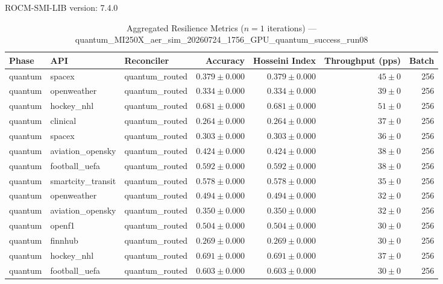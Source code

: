 ROCM-SMI-LIB version: 7.4.0

\begin{table}[htbp]
\caption{Aggregated Resilience Metrics ($n=1$ iterations) --- quantum_MI250X_aer_sim_20260724_1756_GPU_quantum_success_run08}
\begin{tabular}{l l l r r r r}
\hline
Phase & API & Reconciler & Accuracy & Hosseini Index & Throughput (pps) & Batch \\
\hline
quantum & spacex & quantum\_routed & $0.379\pm0.000$ & $0.379\pm0.000$ & $45\pm0$ & 256 \\
quantum & openweather & quantum\_routed & $0.334\pm0.000$ & $0.334\pm0.000$ & $39\pm0$ & 256 \\
quantum & hockey\_nhl & quantum\_routed & $0.681\pm0.000$ & $0.681\pm0.000$ & $51\pm0$ & 256 \\
quantum & clinical & quantum\_routed & $0.264\pm0.000$ & $0.264\pm0.000$ & $37\pm0$ & 256 \\
quantum & spacex & quantum\_routed & $0.303\pm0.000$ & $0.303\pm0.000$ & $36\pm0$ & 256 \\
quantum & aviation\_opensky & quantum\_routed & $0.424\pm0.000$ & $0.424\pm0.000$ & $38\pm0$ & 256 \\
quantum & football\_uefa & quantum\_routed & $0.592\pm0.000$ & $0.592\pm0.000$ & $38\pm0$ & 256 \\
quantum & smartcity\_transit & quantum\_routed & $0.578\pm0.000$ & $0.578\pm0.000$ & $35\pm0$ & 256 \\
quantum & openweather & quantum\_routed & $0.494\pm0.000$ & $0.494\pm0.000$ & $32\pm0$ & 256 \\
quantum & aviation\_opensky & quantum\_routed & $0.350\pm0.000$ & $0.350\pm0.000$ & $32\pm0$ & 256 \\
quantum & openf1 & quantum\_routed & $0.504\pm0.000$ & $0.504\pm0.000$ & $30\pm0$ & 256 \\
quantum & finnhub & quantum\_routed & $0.269\pm0.000$ & $0.269\pm0.000$ & $30\pm0$ & 256 \\
quantum & hockey\_nhl & quantum\_routed & $0.691\pm0.000$ & $0.691\pm0.000$ & $37\pm0$ & 256 \\
quantum & football\_uefa & quantum\_routed & $0.603\pm0.000$ & $0.603\pm0.000$ & $30\pm0$ & 256 \\

\end{tabular}
\end{table}
